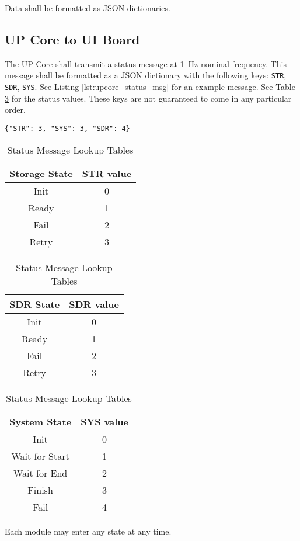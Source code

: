 \documentclass{report}
\begin{document}
			Data shall be formatted as JSON dictionaries.

			\subsection{UP Core to UI Board}\label{ssec:obc_ui_msg}
				The UP Core shall transmit a status message at \SI{1}{\hertz} nominal frequency. This message shall be formatted as a JSON dictionary with the following keys: \lstinline{STR}, \lstinline{SDR}, \lstinline{SYS}.  See Listing \ref{lst:upcore_status_msg} for an example message.  See Table \ref{tbl:obc_status_vals} for the status values.  These keys are not guaranteed to come in any particular order.

				\begin{lstlisting}[caption={UP Core Status Message}, label={lst:upcore_status_msg}]
{"STR": 3, "SYS": 3, "SDR": 4}
				\end{lstlisting}

				\begin{table}[htp]
					\centering
					\caption{Status Message Lookup Tables}
					\label{tbl:obc_status_vals}
					\begin{tabular}{c|c}
						Storage State & STR value \\\hline
						Init & 0\\
						Ready & 1\\
						Fail & 2\\
						Retry & 3
					\end{tabular}
					\begin{tabular}{c|c}
						SDR State & SDR value \\\hline
						Init & 0\\
						Ready & 1\\
						Fail & 2\\
						Retry & 3
					\end{tabular}
					\begin{tabular}{c|c}
						System State & SYS value\\\hline
						Init & 0\\
						Wait for Start & 1\\
						Wait for End & 2\\
						Finish & 3\\
						Fail & 4
					\end{tabular}
				\end{table}

				Each module may enter any state at any time.
\end{document}
